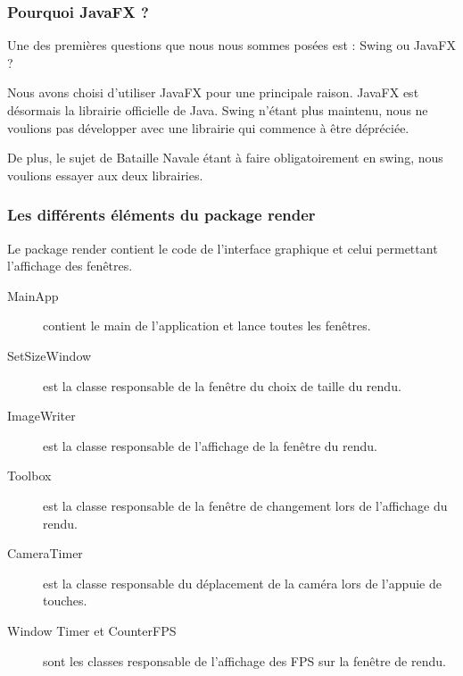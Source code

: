 \subsubsection{Pourquoi JavaFX ?}

Une des premières questions que nous nous sommes posées est : Swing ou JavaFX ?

Nous avons choisi d'utiliser JavaFX pour une principale raison. JavaFX est désormais la librairie officielle de Java. Swing n'étant plus maintenu, nous ne voulions pas développer avec une librairie qui commence à être dépréciée.

De plus, le sujet de Bataille Navale étant à faire obligatoirement en swing, nous voulions essayer aux deux librairies.

\subsubsection{Les différents éléments du package render}

Le package render contient le code de l'interface graphique et celui permettant l'affichage des fenêtres.

\begin{description}
    \item [MainApp] contient le main de l'application et lance toutes les fenêtres.
    \item [SetSizeWindow] est la classe responsable de la fenêtre du choix de taille du rendu.
    \item [ImageWriter] est la classe responsable de l'affichage de la fenêtre du rendu.
    \item [Toolbox] est la classe responsable de la fenêtre de changement lors de l'affichage du rendu.
    \item [CameraTimer] est la classe responsable du déplacement de la caméra lors de l'appuie de touches.
    \item [Window Timer et CounterFPS] sont les classes responsable de l'affichage des FPS sur la fenêtre de rendu.
\end{description}
